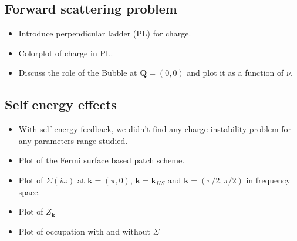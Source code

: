 \subsection{Forward scattering problem}

\begin{itemize}

\item Introduce perpendicular ladder (PL) for charge.

\item Colorplot of charge in PL.

\item Discuss the role of the Bubble at $\boldsymbol{Q}=(0,0)$ and plot it as a function of $\nu$.

\end{itemize}

\subsection{Self energy effects}

\begin{itemize}

\item With self energy feedback, we didn't find any charge instability problem for any parameters range studied.

\item Plot of the Fermi surface based patch scheme.

\item Plot of $\Sigma(i\omega)$ at $\boldsymbol{k}=(\pi,0)$, $\boldsymbol{k}=\boldsymbol{k}_{HS}$ and $\boldsymbol{k}=(\pi/2,\pi/2)$ in frequency space.

\item Plot of $Z_{\boldsymbol{k}}$

\item Plot of occupation with and without $\Sigma$

\end{itemize}
